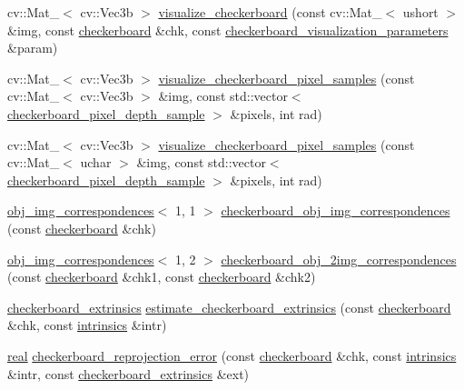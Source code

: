 \begin{DoxyCompactItemize}
\item 
cv\+::\+Mat\+\_\+$<$ cv\+::\+Vec3b $>$ \hyperlink{namespacetlz_aa6dbbbefcc3d6f2e8a52d7e50c7414a8}{visualize\+\_\+checkerboard} (const cv\+::\+Mat\+\_\+$<$ ushort $>$ \&img, const \hyperlink{structtlz_1_1checkerboard}{checkerboard} \&chk, const \hyperlink{structtlz_1_1checkerboard__visualization__parameters}{checkerboard\+\_\+visualization\+\_\+parameters} \&param)
\item 
cv\+::\+Mat\+\_\+$<$ cv\+::\+Vec3b $>$ \hyperlink{namespacetlz_ab1a9db5eb0f9631c1d0b88d38dee54c7}{visualize\+\_\+checkerboard\+\_\+pixel\+\_\+samples} (const cv\+::\+Mat\+\_\+$<$ cv\+::\+Vec3b $>$ \&img, const std\+::vector$<$ \hyperlink{structtlz_1_1checkerboard__pixel__depth__sample}{checkerboard\+\_\+pixel\+\_\+depth\+\_\+sample} $>$ \&pixels, int rad)
\item 
cv\+::\+Mat\+\_\+$<$ cv\+::\+Vec3b $>$ \hyperlink{namespacetlz_a9de9ec9a4079abe7e1512b6a858709e4}{visualize\+\_\+checkerboard\+\_\+pixel\+\_\+samples} (const cv\+::\+Mat\+\_\+$<$ uchar $>$ \&img, const std\+::vector$<$ \hyperlink{structtlz_1_1checkerboard__pixel__depth__sample}{checkerboard\+\_\+pixel\+\_\+depth\+\_\+sample} $>$ \&pixels, int rad)
\item 
\hyperlink{namespacetlz_a59fe514deacf47a3f4a14450a3752725}{obj\+\_\+img\+\_\+correspondences}$<$ 1, 1 $>$ \hyperlink{namespacetlz_ac4a9d8aef6e9eed327aedbb69975cfb9}{checkerboard\+\_\+obj\+\_\+img\+\_\+correspondences} (const \hyperlink{structtlz_1_1checkerboard}{checkerboard} \&chk)
\item 
\hyperlink{namespacetlz_a59fe514deacf47a3f4a14450a3752725}{obj\+\_\+img\+\_\+correspondences}$<$ 1, 2 $>$ \hyperlink{namespacetlz_a37c58db2fc50f660edd9245c26e1c097}{checkerboard\+\_\+obj\+\_\+2img\+\_\+correspondences} (const \hyperlink{structtlz_1_1checkerboard}{checkerboard} \&chk1, const \hyperlink{structtlz_1_1checkerboard}{checkerboard} \&chk2)
\item 
\hyperlink{structtlz_1_1checkerboard__extrinsics}{checkerboard\+\_\+extrinsics} \hyperlink{namespacetlz_ac176ab31932290f05fb3c647f8ecdd85}{estimate\+\_\+checkerboard\+\_\+extrinsics} (const \hyperlink{structtlz_1_1checkerboard}{checkerboard} \&chk, const \hyperlink{structtlz_1_1intrinsics}{intrinsics} \&intr)
\item 
\hyperlink{namespacetlz_a15fd37cce97f2b8b606af18c2615f602}{real} \hyperlink{namespacetlz_a5e1056b3850f12627a759922716bee56}{checkerboard\+\_\+reprojection\+\_\+error} (const \hyperlink{structtlz_1_1checkerboard}{checkerboard} \&chk, const \hyperlink{structtlz_1_1intrinsics}{intrinsics} \&intr, const \hyperlink{structtlz_1_1checkerboard__extrinsics}{checkerboard\+\_\+extrinsics} \&ext)

\end{DoxyCompactItemize}

